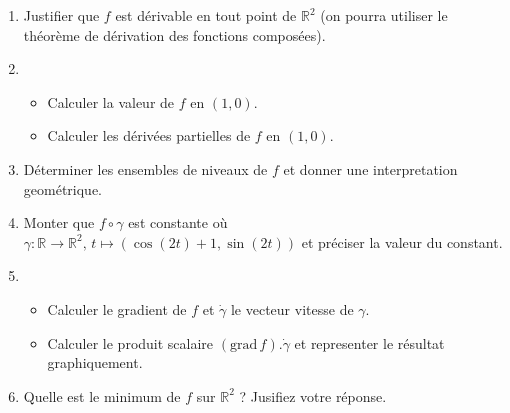 \documentclass[a4paper,12pt]{article}
\begin{document}
\begin{enumerate}
	\item Justifier que $f$ est dérivable en tout point de
		$\mathbb{R}^2$ (on pourra utiliser le théorème
		de dérivation des fonctions composées).
	\item	
	\begin{itemize}
	\item Calculer la valeur de $f$ en $(1,0)$.
	\item Calculer les dérivées partielles de $f$ en $(1,0)$.
	\end{itemize}
	\item Déterminer les ensembles de niveaux de $f$ et
		donner une interpretation geométrique.
	\item Monter que $f\circ \gamma$ est constante o\`u
		$\gamma: \mathbb{R} \rightarrow
		\mathbb{R}^2
		,\, t \mapsto (\cos(2t)+1,\sin(2t))$ et préciser
		la valeur du constant.

	\item  
		\begin{itemize} 
			\item Calculer le gradient de $f$ et $\dot{\gamma}$ le vecteur vitesse de $\gamma$. 
			\item Calculer le produit scalaire 
		$(\mathrm{grad}\,f).\dot{\gamma}$ et representer le résultat graphiquement.
\end{itemize}
	\item Quelle est le minimum de $f$ sur $\mathbb{R}^2$
		? Jusifiez votre réponse.
	
\end{enumerate}
 
\end{document}
